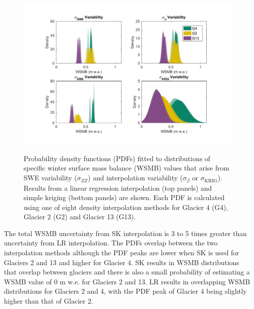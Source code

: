 \documentclass[review,oneside, letterpaper]{igs}
\begin{document}
\begin{figure}
	\centering
\hspace*{-1.2cm}
	\includegraphics[width =1.2\textwidth]{WSMBDist_LR.pdf}\\
	\caption{Probability density functions (PDFs) fitted to distributions of specific winter surface mass balance (WSMB) values that arise from SWE variability ($\sigma_{ZZ}$) and interpolation variability ($\sigma_{\beta}$ or $\sigma_{\mathrm{KRIG}}$). Results from a linear regression interpolation (top panels) and simple kriging (bottom panels) are shown. Each PDF is calculated using one of eight density interpolation methods for Glacier 4 (G4), Glacier 2 (G2) and Glacier 13 (G13).}
	\label{fig:WSMBDist_LR}
\end{figure}

The total WSMB uncertainty from SK interpolation is 3 to 5 times greater than uncertainty from LR interpolation. The PDFs overlap between the two interpolation methods although the PDF peaks are lower when SK is used for Glaciers 2 and 13 and higher for Glacier 4. SK results in WSMB distributions that overlap between glaciers and there is also a small probability of estimating a WSMB value of 0 m w.e. for Glaciers 2 and 13. LR results in overlapping WSMB distributions for Glaciers 2 and 4, with the PDF peak of Glacier 4 being slightly higher than that of Glacier 2. 
\end{document}
